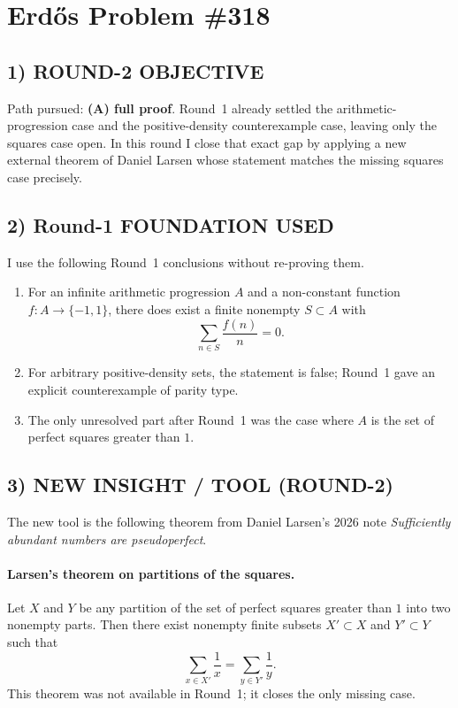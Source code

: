 \section{Erd\H{o}s Problem \#318}

\subsection*{1) ROUND-2 OBJECTIVE}
Path pursued: \textbf{(A) full proof}.  Round~1 already settled the arithmetic-progression case and the positive-density counterexample case, leaving only the squares case open.  In this round I close that exact gap by applying a new external theorem of Daniel Larsen whose statement matches the missing squares case precisely.

\subsection*{2) Round-1 FOUNDATION USED}
I use the following Round~1 conclusions without re-proving them.
\begin{enumerate}
\item For an infinite arithmetic progression $A$ and a non-constant function $f:A\to\{-1,1\}$, there does exist a finite nonempty $S\subset A$ with
\[
\sum_{n\in S} \frac{f(n)}{n}=0.
\]
\item For arbitrary positive-density sets, the statement is false; Round~1 gave an explicit counterexample of parity type.
\item The only unresolved part after Round~1 was the case where $A$ is the set of perfect squares greater than $1$.
\end{enumerate}

\subsection*{3) NEW INSIGHT / TOOL (ROUND-2)}
The new tool is the following theorem from Daniel Larsen's 2026 note \emph{Sufficiently abundant numbers are pseudoperfect}.

\paragraph{Larsen's theorem on partitions of the squares.}
Let $X$ and $Y$ be any partition of the set of perfect squares greater than $1$ into two nonempty parts.  Then there exist nonempty finite subsets $X'\subset X$ and $Y'\subset Y$ such that
\[
\sum_{x\in X'} \frac1x = \sum_{y\in Y'} \frac1y.
\]
This theorem was not available in Round~1; it closes the only missing case.

